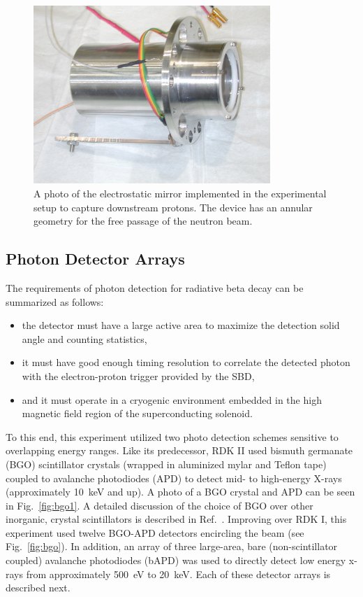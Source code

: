 \documentclass[oneside,12pt]{memoir}
\begin{document}
\begin{figure}[t]
	\centering
	\includegraphics[width=0.8\textwidth]{Mirror1.jpg}
	\caption[A photo of the electrostatic mirror.]{A photo of the electrostatic mirror implemented in the experimental setup to capture downstream protons. The device has an annular geometry for the free passage of the neutron beam.}
	\label{fig:mirror}
\end{figure}


\subsection{Photon Detector Arrays}
\label{sec:photo}
The requirements of photon detection for radiative beta decay can be summarized as follows:
\begin{itemize}
	\item the detector must have a large active area to maximize the detection solid angle and counting statistics,
	\item it must have good enough timing resolution to correlate the detected photon with the electron-proton trigger provided by the SBD,
	\item and it must operate in a cryogenic environment embedded in the high magnetic field region of the superconducting solenoid.
\end{itemize}
To this end, this experiment utilized two photo detection schemes sensitive to overlapping energy ranges. Like its predecessor, RDK II used bismuth germanate (BGO) scintillator crystals (wrapped in aluminized mylar and Teflon tape) coupled to avalanche photodiodes (APD) to detect mid- to high-energy X-rays (approximately 10~keV and up). A photo of a BGO crystal and APD can be seen in Fig.~\ref{fig:bgo1}. A detailed discussion of the choice of BGO over other inorganic, crystal scintillators is described in Ref.~\cite{thesis:cooper}. Improving over RDK I, this experiment used twelve BGO-APD detectors encircling the beam (see Fig.~\ref{fig:bgo}). In addition, an array of three large-area, bare (non-scintillator coupled) avalanche photodiodes (bAPD) was used to directly detect low energy x-rays from approximately 500~eV to 20~keV. Each of these detector arrays is described next.\par
\end{document}
